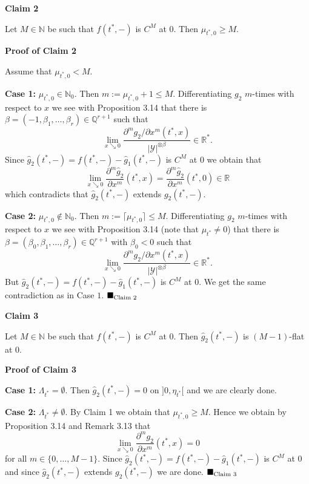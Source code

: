 \documentclass[12pt]{article}
\def\vs{\vspace}
\def\IN{\mathbb N}
\def\IR{\mathbb R}
\def\IQ{\mathbb Q}
\def\ma{\mathcal}
\begin{document}
\vs{0.4cm}
{\bf Claim 2}

\vs{0.1cm}
Let $M\in \IN$ be such that $f(t^*,-)$ is $C^M$ at $0$.
Then  $\mu_{t^*,0} \geq M$.

\vs{0.2cm}
{\bf Proof of Claim 2}

\vs{0.1cm}
Assume that $\mu_{t^*,0}<M$. 

\vs{0.2cm}
{\bf Case 1:} $\mu_{t^*,0}\in \mathbb{N}_0$. Then $m:=\mu_{t^*,0}+1\leq M$.
Differentiating $g_2$ $m$-times with respect to
$x$ we see with Proposition 3.14 that there is $\beta=(-1,\beta_1,\ldots,\beta_r)\in \mathbb{Q}^{r+1}$ such that
$$\lim_{x \searrow 0}\frac{\partial^{m}g_2/\partial x^{m}(t^*,x)}{|\ma{Y}|^{\otimes \beta}}\in \mathbb{R}^*.$$
Since $\hat{g}_2(t^*,-)=f(t^*,-) - \hat{g}_1(t^*,-)$ is $C^M$ at $0$ we obtain that
$$\lim\limits_{x \searrow 0} \frac{\partial^m\hat{g}_2}{\partial x^m}(t^*,x)=\frac{\partial^m\hat{g}_2}{\partial x^m}(t^*,0) \in \mathbb{R}$$
which contradicts that $\hat{g}_2(t^*,-)$ extends $g_2(t^*,-)$.

\vs{0.2cm}
{\bf Case 2:} $\mu_{t^*,0} \notin \mathbb{N}_0$. Then $m:=\lceil \mu_{t^*,0}\rceil \leq M$. Differentiating $g_2$ $m$-times with respect to $x$ we see with Proposition 3.14 (note that $\mu_{t^*} \neq 0$) that there is $\beta=(\beta_0,\beta_1,\ldots,\beta_r)\in \IQ^{r+1}$ with $\beta_0<0$ such that
$$\lim_{x \searrow 0}\frac{\partial^{m}g_2/\partial x^m(t^*,x)}{|\ma{Y}|^{\otimes \beta}}\in \IR^*.$$
But $\hat{g}_2(t^*,-)=f(t^*,-) - \hat{g}_1(t^*,-)$ is $C^M$ at $0$. We get the same contradiction as in Case $1$.
\hfill$\blacksquare_{\textnormal{Claim }2}$

\vs{0.4cm}
{\bf Claim 3}

\vs{0.1cm}
Let $M \in \mathbb{N}$ be such that $f(t^*,-)$ is $C^M$ at $0$. Then $\hat{g}_2(t^*,-)$ is $(M-1)$-flat at $0$.

\vs{0.2cm}
{\bf Proof of Claim 3}

\vs{0.1cm}
\textbf{Case 1:} $\Lambda_{t^*}=\emptyset$.
Then $\hat{g}_2(t^*,-)=0$ on $]0,\eta_{t^*}[$ and we are clearly done.

\vs{0.2cm}
\textbf{Case 2:} $\Lambda_{t^*} \neq \emptyset$. By Claim 1 we obtain that $\mu_{t^*,0} \geq M$. Hence we obtain by Proposition 3.14 and Remark 3.13 that
$$\lim_{x \searrow 0}\frac{\partial^m g_2}{\partial x^m}(t^*,x)=0$$
for all $m\in \{0,...,M-1\}$. Since $\hat{g}_2(t^*,-)=f(t^*,-)-\hat{g}_1(t^*,-)$ is $C^M$ at $0$ and since $\hat{g}_2(t^*,-)$ extends $g_2(t^*,-)$ we are done. \hfill$\blacksquare_{\textnormal{Claim }3}$
\end{document}
